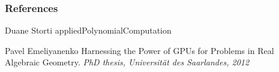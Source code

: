 \documentclass{beamer}
\begin{document}
	

	
	
	
	
	
	
	\begin{frame}
		\frametitle{References}
		\footnotesize{
			\begin{thebibliography}{99} %
				 Duane Storti 
				\newblock appliedPolynomialComputation
				
				 Pavel Emeliyanenko
				\newblock Harnessing the Power of GPUs for Problems in Real Algebraic Geometry.
				\newblock \emph{PhD thesis, Universität des Saarlandes, 2012} 
			\end{thebibliography}
		}
	\end{frame}
	
\end{document}
